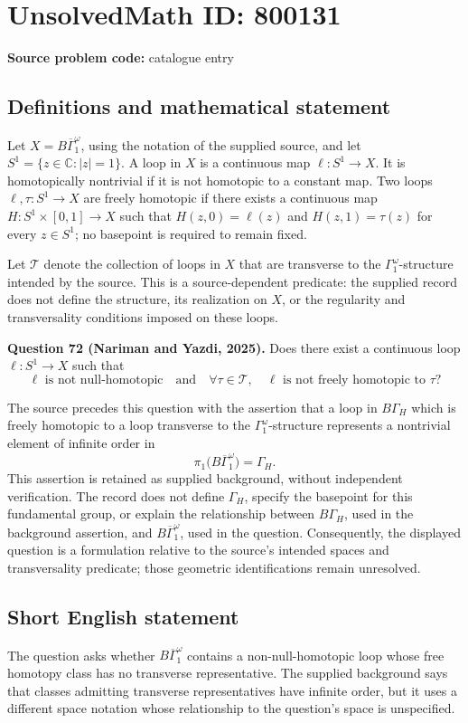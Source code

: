 \documentclass[11pt]{article}
\newcommand{\C}{\mathbb{C}}
\begin{document}
\section*{UnsolvedMath ID: 800131}
\textbf{Source problem code:} catalogue entry
\subsection{Definitions and mathematical statement}
Let \(X=B\overline{\Gamma}^{\omega}_{1}\), using the notation of the supplied source, and let \(S^{1}=\{z\in\C:|z|=1\}\). A loop in \(X\) is a continuous map \(\ell:S^{1}\to X\). It is homotopically nontrivial if it is not homotopic to a constant map. Two loops \(\ell,\tau:S^{1}\to X\) are freely homotopic if there exists a continuous map \(H:S^{1}\times[0,1]\to X\) such that \(H(z,0)=\ell(z)\) and \(H(z,1)=\tau(z)\) for every \(z\in S^{1}\); no basepoint is required to remain fixed.

Let \(\mathcal T\) denote the collection of loops in \(X\) that are transverse to the \(\Gamma^{\omega}_{1}\)-structure intended by the source. This is a source-dependent predicate: the supplied record does not define the structure, its realization on \(X\), or the regularity and transversality conditions imposed on these loops.

\textbf{Question 72 (Nariman and Yazdi, 2025).} Does there exist a continuous loop \(\ell:S^{1}\to X\) such that
\[
\ell\text{ is not null-homotopic}
\quad\text{and}\quad
\forall\tau\in\mathcal T,\quad \ell\text{ is not freely homotopic to }\tau?
\]

The source precedes this question with the assertion that a loop in \(B\Gamma_H\) which is freely homotopic to a loop transverse to the \(\Gamma^{\omega}_{1}\)-structure represents a nontrivial element of infinite order in
\[
\pi_1\bigl(B\overline{\Gamma}^{\omega}_{1}\bigr)=\Gamma_H.
\]
This assertion is retained as supplied background, without independent verification. The record does not define \(\Gamma_H\), specify the basepoint for this fundamental group, or explain the relationship between \(B\Gamma_H\), used in the background assertion, and \(B\overline{\Gamma}^{\omega}_{1}\), used in the question. Consequently, the displayed question is a formulation relative to the source's intended spaces and transversality predicate; those geometric identifications remain unresolved.
\subsection{Short English statement}
The question asks whether \(B\overline{\Gamma}^{\omega}_{1}\) contains a non-null-homotopic loop whose free homotopy class has no transverse representative. The supplied background says that classes admitting transverse representatives have infinite order, but it uses a different space notation whose relationship to the question's space is unspecified.
\end{document}
